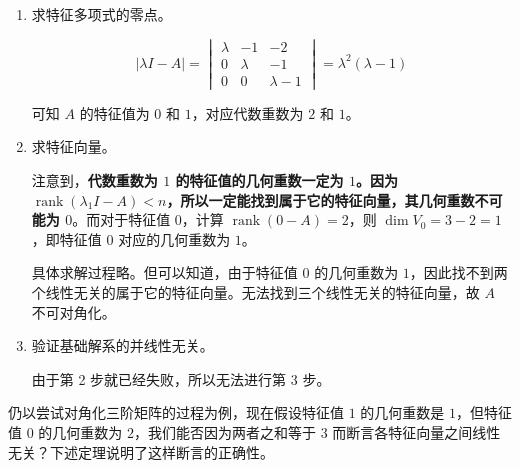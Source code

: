 \begin{solve}
	\begin{enumerate}
		\item 求特征多项式的零点。

		$$
		|\lambda I - A| = \begin{vmatrix} \lambda & -1 & -2 \\ 0 & \lambda & -1 \\ 0 & 0 & \lambda - 1 \end{vmatrix} = \lambda^2(\lambda - 1)
		$$

		可知 $A$ 的特征值为 $0$ 和 $1$，对应代数重数为 $2$ 和 $1$。

		\item 求特征向量。

		注意到，\textbf{代数重数为 $1$ 的特征值的几何重数一定为 $1$。因为 $\operatorname{rank} (\lambda_1 I - A) < n$，所以一定能找到属于它的特征向量，其几何重数不可能为 $0$}。而对于特征值 $0$，计算 $\operatorname{rank}(0 - A) = 2$，则 $\dim V_0 = 3 - 2 = 1$，即特征值 $0$ 对应的几何重数为 $1$。

		具体求解过程略。但可以知道，由于特征值 $0$ 的几何重数为 $1$，因此找不到两个线性无关的属于它的特征向量。无法找到三个线性无关的特征向量，故 $A$ 不可对角化。

		\item 验证基础解系的并线性无关。

		由于第 2 步就已经失败，所以无法进行第 3 步。
	\end{enumerate}
\end{solve}

仍以尝试对角化三阶矩阵的过程为例，现在假设特征值 $1$ 的几何重数是 $1$，但特征值 $0$ 的几何重数为 $2$，我们能否因为两者之和等于 $3$ 而断言各特征向量之间线性无关？下述定理说明了这样断言的正确性。

